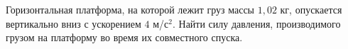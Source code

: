 Горизонтальная платформа, на которой лежит груз массы $1,02$ кг, опускается вертикально вниз с ускорением $4$ м/с$^2$.
Найти силу давления, производимого грузом на платформу во время их совместного спуска.
